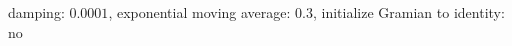 damping: $\num[scientific-notation=true]{0.0001}$, exponential moving average: $\num[scientific-notation=true]{0.3}$, initialize Gramian to identity: no